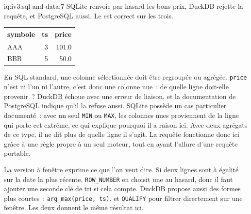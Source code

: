 \begin{solution}{iq:iv3:sql-and-data:7}
SQLite renvoie par hasard les bons prix, DuckDB rejette la requête, et PostgreSQL aussi. Le  est correct sur les trois.
\label{lst:iv3:sq:latest}
\begin{center}\small
\begin{tabular}{lrr}
symbole & ts & price\\\hline
AAA & 3 & 101.0\\
BBB & 5 & 50.0
\end{tabular}
\end{center}
En SQL standard, une colonne sélectionnée doit être regroupée ou agrégée. \texttt{price} n'est ni l'un ni l'autre, c'est donc une colonne nue~: de quelle ligne doit-elle provenir~? DuckDB échoue avec une erreur de liaison, et la documentation de PostgreSQL indique qu'il la refuse aussi. SQLite possède un cas particulier documenté~: avec un seul \texttt{MIN} ou \texttt{MAX}, les colonnes nues proviennent de la ligne qui porte cet extrême, ce qui explique pourquoi il a raison ici. Avec deux agrégats de ce type, il ne dit plus de quelle ligne il s'agit. La requête fonctionne donc ici grâce à une règle propre à un seul moteur, tout en ayant l'allure d'une requête portable.

La version à fenêtre exprime ce que l'on veut dire. Si deux lignes sont à égalité sur la date la plus récente, \texttt{ROW\_NUMBER} en choisit une au hasard, donc il faut ajouter une seconde clé de tri si cela compte. DuckDB propose aussi des formes plus courtes~: \texttt{arg\_max(price, ts)}, et \texttt{QUALIFY} pour filtrer directement sur une fenêtre. Les deux donnent le même résultat ici.

\end{solution}

